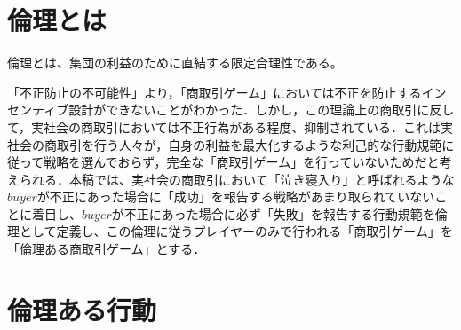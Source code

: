 \section{倫理とは}
倫理とは、集団の利益のために直結する限定合理性である。


「不正防止の不可能性」より，「商取引ゲーム」においては不正を防止するインセンティブ設計ができないことがわかった．しかし，この理論上の商取引に反して，実社会の商取引においては不正行為がある程度、抑制されている．これは実社会の商取引を行う人々が，自身の利益を最大化するような利己的な行動規範に従って戦略を選んでおらず，完全な「商取引ゲーム」を行っていないためだと考えられる．本稿では、実社会の商取引において「泣き寝入り」と呼ばれるような$buyer$が不正にあった場合に「成功」を報告する戦略があまり取られていないことに着目し、$buyer$が不正にあった場合に必ず「失敗」を報告する行動規範を倫理として定義し、この倫理に従うプレイヤーのみで行われる「商取引ゲーム」を「倫理ある商取引ゲーム」とする．


\section{倫理ある行動}

%
